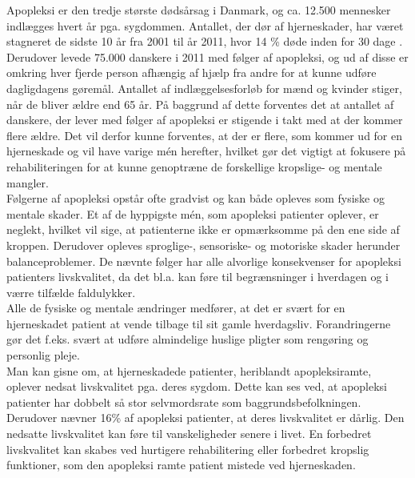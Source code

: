 Apopleksi er den tredje største dødsårsag i Danmark, og ca. 12.500 mennesker indlægges hvert år pga. sygdommen\cite{Hjernesagen2015a}. Antallet, der dør af hjerneskader, har været stagneret de sidste 10 år fra 2001 til år 2011, hvor 14 \% døde inden for 30 dage \cite{Hjernesagen2015}. Derudover levede 75.000 danskere i 2011 med følger af apopleksi, og ud af disse er omkring hver fjerde person afhængig af hjælp fra andre for at kunne udføre dagligdagens gøremål\cite{Hjernesagen2015a}. Antallet af indlæggelsesforløb for mænd og kvinder stiger, når de bliver ældre end 65 år\cite{Sundhedsstyrelsen2011}.
På baggrund af dette forventes det at antallet af danskere, der lever med følger af apopleksi er stigende i takt med at der kommer flere ældre. \cite{Sagen2014} 
Det vil derfor kunne forventes, at der er flere, som kommer ud for en hjerneskade og vil have varige mén herefter, hvilket gør det vigtigt at fokusere på rehabiliteringen for at kunne genoptræne de forskellige kropslige- og mentale mangler. \\
Følgerne af apopleksi opstår ofte gradvist og kan både opleves som fysiske og mentale skader\cite{Muus2008}. Et af de hyppigste mén, som apopleksi patienter oplever, er neglekt, hvilket vil sige, at patienterne ikke er opmærksomme på den ene side af kroppen\cite{Sundhed.dk}. Derudover opleves sproglige-, sensoriske- og motoriske skader herunder balanceproblemer. De nævnte følger har alle alvorlige konsekvenser for apopleksi patienters livskvalitet, da det bl.a. kan føre til  begrænsninger i hverdagen og i værre tilfælde faldulykker.\cite{Nichols1997, Muus2008} \\
Alle de fysiske og mentale ændringer medfører, at det er svært for en hjerneskadet patient at vende tilbage til sit gamle hverdagsliv. Forandringerne gør det f.eks. svært at udføre almindelige huslige pligter som rengøring og personlig pleje.\cite{Sundhedsstyrelsen2010} \\
Man kan gisne om, at hjerneskadede patienter, heriblandt apopleksiramte, oplever nedsat livskvalitet pga. deres sygdom. Dette kan ses ved, at apopleksi patienter har dobbelt så stor selvmordsrate som baggrundsbefolkningen. Derudover nævner 16\% af apopleksi patienter, at deres livskvalitet er dårlig\cite{Sundhedsstyrelsen2010}. Den nedsatte livskvalitet kan føre til vanskeligheder senere i livet. En forbedret livskvalitet kan skabes ved hurtigere rehabilitering eller forbedret kropslig funktioner, som den apopleksi ramte patient mistede ved hjerneskaden.\cite{Sundhedsstyrelsen2010} \\
